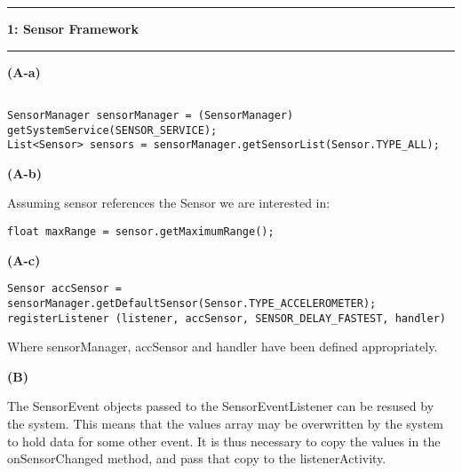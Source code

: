 \documentclass[11pt]{article}
\newcommand\question[2]{\vspace{.25in}\hrule\textbf{#1: #2}\vspace{.5em}\hrule\vspace{.10in}}
\renewcommand\part[1]{\vspace{.10in}\textbf{(#1)}}
\begin{document}
\raggedright

\newcommand\NAME{Lukas, Young, Vincent}  %

\question{1}{Sensor Framework}

\part{A-a}

\begin{small}
\begin{lstlisting}[frame=single]

SensorManager sensorManager = (SensorManager) getSystemService(SENSOR_SERVICE);
List<Sensor> sensors = sensorManager.getSensorList(Sensor.TYPE_ALL);
\end{lstlisting}
\end{small}

\part{A-b}

Assuming sensor references the Sensor we are interested in:

\begin{small}
\begin{lstlisting}[frame=single]
float maxRange = sensor.getMaximumRange();
\end{lstlisting}
\end{small}


\part{A-c}

\begin{small}
\begin{lstlisting}[frame=single]
Sensor accSensor = sensorManager.getDefaultSensor(Sensor.TYPE_ACCELEROMETER);
registerListener (listener, accSensor, SENSOR_DELAY_FASTEST, handler)
\end{lstlisting}
\end{small}

Where sensorManager, accSensor and handler have been defined appropriately.

\part{B}

The SensorEvent objects passed to the SensorEventListener can be resused by the system. This means that the values array may be overwritten by the system to hold data for some other event. It is thus necessary to copy the values in the onSensorChanged method, and pass that copy to the listenerActivity.
\end{document}
